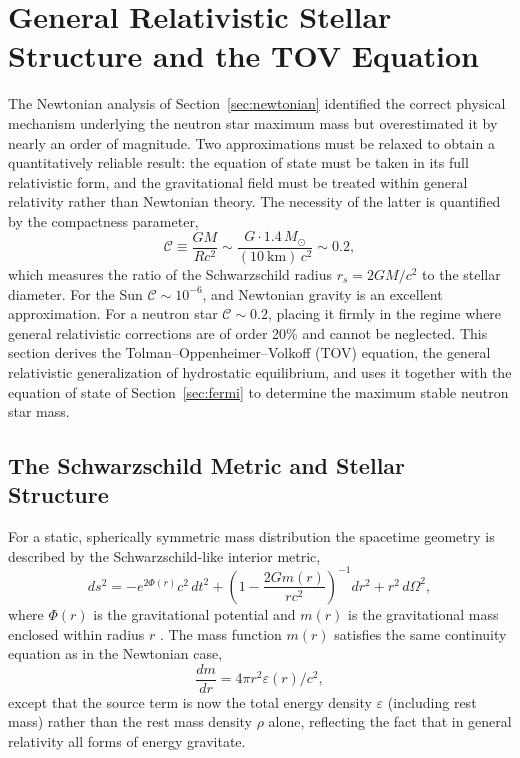 \section{General Relativistic Stellar Structure and the TOV Equation}
\label{sec:tov}

The Newtonian analysis of Section~\ref{sec:newtonian} identified the
correct physical mechanism underlying the neutron star maximum mass but
overestimated it by nearly an order of magnitude. Two approximations must
be relaxed to obtain a quantitatively reliable result: the equation of
state must be taken in its full relativistic form, and the gravitational
field must be treated within general relativity rather than Newtonian
theory. The necessity of the latter is quantified by the compactness
parameter,
%
\begin{equation}
    \mathcal{C} \equiv \frac{GM}{Rc^2}
                \sim \frac{G \cdot 1.4\,M_\odot}{(10~\text{km})\,c^2}
                \sim 0.2,
    \label{eq:compactness}
\end{equation}
%
which measures the ratio of the Schwarzschild radius $r_s = 2GM/c^2$ to
the stellar diameter. For the Sun $\mathcal{C} \sim 10^{-6}$, and
Newtonian gravity is an excellent approximation. For a neutron star
$\mathcal{C} \sim 0.2$, placing it firmly in the regime where
general relativistic corrections are of order 20\% and cannot be
neglected. This section derives the Tolman--Oppenheimer--Volkoff (TOV)
equation, the general relativistic generalization of hydrostatic
equilibrium, and uses it together with the equation of state of
Section~\ref{sec:fermi} to determine the maximum stable neutron star mass.

\subsection{The Schwarzschild Metric and Stellar Structure}

For a static, spherically symmetric mass distribution the spacetime
geometry is described by the Schwarzschild-like interior metric,
%
\begin{equation}
    ds^2 = -e^{2\Phi(r)}c^2\,dt^2
           + \left(1 - \frac{2Gm(r)}{rc^2}\right)^{-1}dr^2
           + r^2\,d\Omega^2,
    \label{eq:interior-metric}
\end{equation}
%
where $\Phi(r)$ is the gravitational potential and $m(r)$ is the
gravitational mass enclosed within radius $r$ \cite{Misner1973}. The
mass function $m(r)$ satisfies the same continuity equation as in the
Newtonian case,
%
\begin{equation}
    \frac{dm}{dr} = 4\pi r^2 \varepsilon(r)/c^2,
    \label{eq:mass-continuity-gr}
\end{equation}
%
except that the source term is now the total energy density $\varepsilon$
(including rest mass) rather than the rest mass density $\rho$ alone,
reflecting the fact that in general relativity all forms of energy
gravitate.

